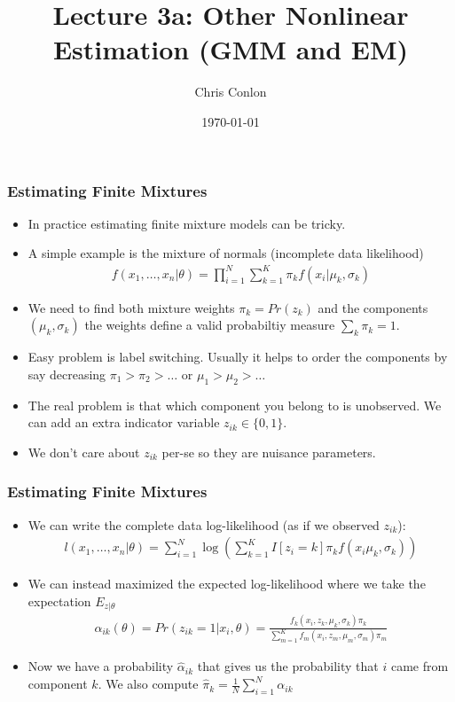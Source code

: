 \documentclass[aspectratio=169]{beamer}
\title{Lecture 3a: Other Nonlinear Estimation (GMM and EM)}
\author{Chris Conlon }
\institute{NYU Stern }
\date{\today}
\begin{document}
\maketitle


\begin{frame}
\frametitle{Estimating Finite Mixtures}
\begin{itemize}
\item In practice estimating finite mixture models can be tricky.
\item A simple example is the mixture of normals (incomplete data likelihood)
\begin{eqnarray*}
f(x_1,\ldots,x_n | \theta) = \prod_{i=1}^N \sum_{k=1}^K \pi_k f(x_i | \mu_k, \sigma_k)
\end{eqnarray*}
\item We need to find both mixture weights $\pi_k = Pr(z_k)$ and the components $(\mu_k,\sigma_k)$ the weights define a valid probabiltiy measure $\sum_k \pi_k = 1$.
\item Easy problem is \alert{label switching}. Usually it helps to order the components by say decreasing $\pi_1 > \pi_2 > \ldots$ or  $\mu_1 > \mu_2 > \ldots$ 
\item The real problem is that which component you belong to is unobserved. We can add an extra indicator variable $z_{ik} \in \{0,1\}$.
\item We don't care about $z_{ik}$ per-se so they are \alert{nuisance parameters}.
\end{itemize}
\end{frame}

\begin{frame}
\frametitle{Estimating Finite Mixtures}
\begin{itemize}
\item We can write the complete data log-likelihood (as if we observed $z_{ik}$):
\begin{eqnarray*}
l(x_1,\ldots,x_n | \theta) = \sum_{i=1}^N  \log \left( \sum_{k=1}^K I[z_i = k]  \pi_k f(x_i \mu_k, \sigma_k) \right)
\end{eqnarray*}
\item We can instead maximized the expected log-likelihood where we take the expectation $E_{z|\theta}$
\begin{eqnarray*}
\alpha_{ik}(\theta) = Pr(z_{ik} =1 | x_i,\theta) = \frac{f_k(x_i,z_k,\mu_k,\sigma_k) \pi_k }{\sum_{m=1}^K f_m(x_i,z_m,\mu_m,\sigma_m) \pi_m}
\end{eqnarray*}
\item Now we have a probability $\hat{\alpha}_{ik}$ that gives us the probability that $i$ came from component $k$. We also compute $\hat{\pi}_k = \frac{1}{N} \sum_{i=1}^N \alpha_{ik}$
\end{itemize}
\end{frame}
\end{document}
